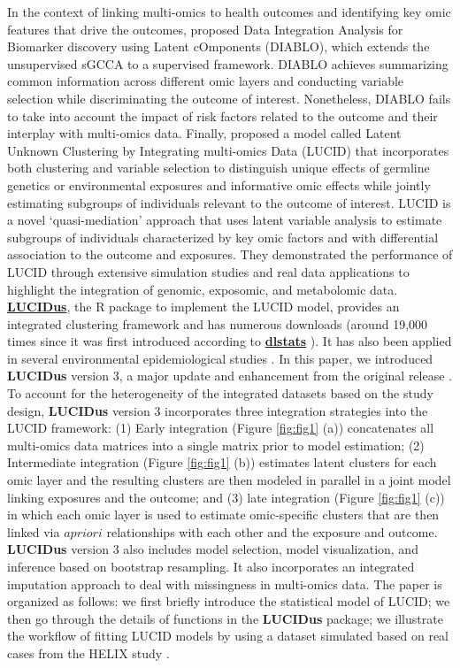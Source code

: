 In the context of linking multi-omics to health outcomes and identifying
key omic features that drive the outcomes, \citet{singh2019diablo} proposed
Data Integration Analysis for Biomarker discovery using Latent
cOmponents (DIABLO), which extends the unsupervised sGCCA to a
supervised framework. DIABLO achieves summarizing common information
across different omic layers and conducting variable selection while
discriminating the outcome of interest. Nonetheless, DIABLO fails to
take into account the impact of risk factors related to the outcome and
their interplay with multi-omics data. Finally, \citet{peng2020latent} proposed
a model called Latent Unknown Clustering by Integrating multi-omics Data
(LUCID) that incorporates both clustering and variable selection to
distinguish unique effects of germline genetics or environmental
exposures and informative omic effects while jointly estimating
subgroups of individuals relevant to the outcome of interest. LUCID is a
novel `quasi-mediation' approach that uses latent variable analysis to
estimate subgroups of individuals characterized by key omic factors and
with differential association to the outcome and exposures. They
demonstrated the performance of LUCID through extensive simulation
studies and real data applications to highlight the integration of
genomic, exposomic, and metabolomic data.
\href{https://CRAN.R-project.org/package=LUCIDus}{\textbf{LUCIDus}}, the R package
to implement the LUCID model, provides an integrated clustering
framework and has numerous downloads (around 19,000 times since it was
first introduced according to
\href{https://CRAN.R-project.org/package=dlstats}{\textbf{dlstats}}
\citep{yu2022dlstats}). It has also been applied in several environmental
epidemiological studies
\citep{jin2020perfluoroalkyl, stratakis2020prenatal, matta2022associations}.
In this paper, we introduced \textbf{LUCIDus} version 3, a major update and
enhancement from the original release \citep{LUCIDus}. To account for the
heterogeneity of the integrated datasets based on the study design,
\textbf{LUCIDus} version 3 incorporates three integration strategies into the
LUCID framework: (1) Early integration (Figure \ref{fig:fig1} (a))
concatenates all multi-omics data matrices into a single matrix prior to
model estimation; (2) Intermediate integration (Figure \ref{fig:fig1}
(b)) estimates latent clusters for each omic layer and the resulting
clusters are then modeled in parallel in a joint model linking exposures
and the outcome; and (3) late integration (Figure \ref{fig:fig1} (c))
in which each omic layer is used to estimate omic-specific clusters that
are then linked via \(a priori\) relationships with each other and the
exposure and outcome. \textbf{LUCIDus} version 3 also includes model
selection, model visualization, and inference based on bootstrap
resampling. It also incorporates an integrated imputation approach to
deal with missingness in multi-omics data. The paper is organized as
follows: we first briefly introduce the statistical model of LUCID; we
then go through the details of functions in the \textbf{LUCIDus} package; we
illustrate the workflow of fitting LUCID models by using a dataset
simulated based on real cases from the HELIX study
\citep{vrijheid2014human, maitre2022state}.

